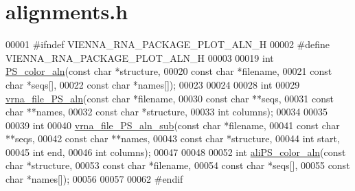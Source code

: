\hypertarget{plotting_2alignments_8h_source}{}\section{alignments.\+h}
\label{plotting_2alignments_8h_source}

\begin{DoxyCode}
00001 \textcolor{preprocessor}{#ifndef VIENNA\_RNA\_PACKAGE\_PLOT\_ALN\_H}
00002 \textcolor{preprocessor}{#define VIENNA\_RNA\_PACKAGE\_PLOT\_ALN\_H}
00003 
00019 \textcolor{keywordtype}{int} \hyperlink{group__plotting__utils_ga821802c3685e37e15182341f6217470d}{PS\_color\_aln}(\textcolor{keyword}{const} \textcolor{keywordtype}{char} *structure,
00020                  \textcolor{keyword}{const} \textcolor{keywordtype}{char} *filename,
00021                  \textcolor{keyword}{const} \textcolor{keywordtype}{char} *seqs[],
00022                  \textcolor{keyword}{const} \textcolor{keywordtype}{char} *names[]);
00023 
00024 
00028 \textcolor{keywordtype}{int}
00029 \hyperlink{group__plotting__utils_ga76b5c0637db9385a553cdd8e66e61eca}{vrna\_file\_PS\_aln}(\textcolor{keyword}{const} \textcolor{keywordtype}{char} *filename,
00030                  \textcolor{keyword}{const} \textcolor{keywordtype}{char} **seqs,
00031                  \textcolor{keyword}{const} \textcolor{keywordtype}{char} **names,
00032                  \textcolor{keyword}{const} \textcolor{keywordtype}{char} *structure,
00033                  \textcolor{keywordtype}{int}        columns);
00034 
00035 
00039 \textcolor{keywordtype}{int}
00040 \hyperlink{group__plotting__utils_ga2881c9b855baff948f92b93262df9ff6}{vrna\_file\_PS\_aln\_sub}(\textcolor{keyword}{const} \textcolor{keywordtype}{char} *filename,
00041                      \textcolor{keyword}{const} \textcolor{keywordtype}{char} **seqs,
00042                      \textcolor{keyword}{const} \textcolor{keywordtype}{char} **names,
00043                      \textcolor{keyword}{const} \textcolor{keywordtype}{char} *structure,
00044                      \textcolor{keywordtype}{int}        start,
00045                      \textcolor{keywordtype}{int}        end,
00046                      \textcolor{keywordtype}{int}        columns);
00047 
00048 
00052 \textcolor{keywordtype}{int} \hyperlink{group__plotting__utils_gaab48d4dac655d688abe921389ac2847c}{aliPS\_color\_aln}(\textcolor{keyword}{const} \textcolor{keywordtype}{char}  *structure,
00053                     \textcolor{keyword}{const} \textcolor{keywordtype}{char}  *filename,
00054                     \textcolor{keyword}{const} \textcolor{keywordtype}{char}  *seqs[],
00055                     \textcolor{keyword}{const} \textcolor{keywordtype}{char}  *names[]);
00056 
00057 
00062 \textcolor{preprocessor}{#endif}
\end{DoxyCode}
